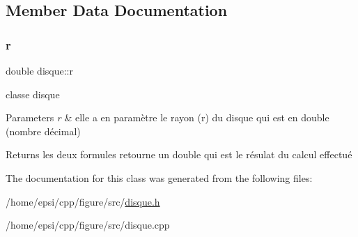 \subsection{Member Data Documentation}
\mbox{\label{classdisque_aa9813a9b5bb721cedf22e425706a2270}} 
\subsubsection{\texorpdfstring{r}{r}}
{\footnotesize\ttfamily double disque\+::r}



classe disque 


\begin{DoxyParams}{Parameters}
{\em r} & elle a en paramètre le rayon (r) du disque qui est en double (nombre décimal) \\
\hline
\end{DoxyParams}
\begin{DoxyReturn}{Returns}
les deux formules retourne un double qui est le résulat du calcul effectué 
\end{DoxyReturn}


The documentation for this class was generated from the following files\+:\begin{DoxyCompactItemize}
\item 
/home/epsi/cpp/figure/src/\hyperlink{disque_8h}{disque.\+h}\item 
/home/epsi/cpp/figure/src/disque.\+cpp\end{DoxyCompactItemize}
